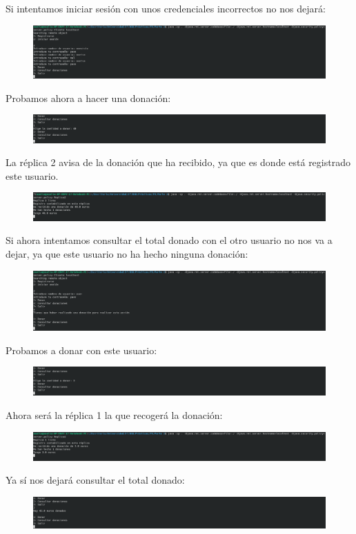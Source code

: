 \documentclass{article}
\begin{document}
	Si intentamos iniciar sesión con unos credenciales incorrectos no nos dejará:
	\begin{figure}[H]
		\centering
		\includegraphics[totalheight=2.36cm]{img/24.png}
	\end{figure}
	Probamos ahora a hacer una donación:
	\begin{figure}[H]
		\centering
		\includegraphics[totalheight=1.27cm]{img/25.png}
	\end{figure}
	La réplica 2 avisa de la donación que ha recibido, ya que es donde está registrado este usuario.
	\begin{figure}[H]
		\centering
		\includegraphics[totalheight=1.27cm]{img/26.png}
	\end{figure}
	Si ahora intentamos consultar el total donado con el otro usuario no nos va a dejar, ya que este usuario no ha hecho ninguna donación:
	\begin{figure}[H]
		\centering
		\includegraphics[totalheight=2.6cm]{img/27.png}
	\end{figure}
	Probamos a donar con este usuario:
	\begin{figure}[H]
		\centering
		\includegraphics[totalheight=1.27cm]{img/28.png}
	\end{figure}
	Ahora será la réplica 1 la que recogerá la donación:
	\begin{figure}[H]
		\centering
		\includegraphics[totalheight=1.27cm]{img/29.png}
	\end{figure}
	Ya sí nos dejará consultar el total donado:
	\begin{figure}[H]
		\centering
		\includegraphics[totalheight=1.37cm]{img/30.png}
	\end{figure}
\end{document}
